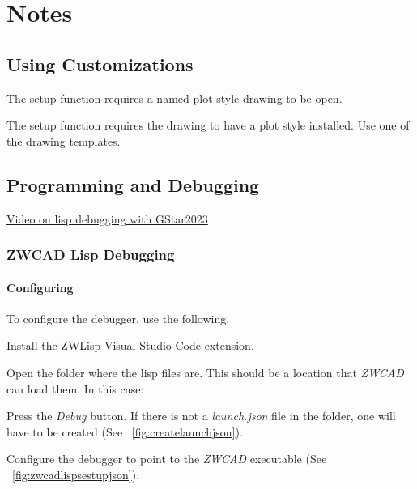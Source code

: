 
\chapter{Notes}
\section{Using Customizations}
\begin{bulletedlist}
	\item The setup function requires a named plot style drawing to be open.
	\item The setup function requires the drawing to have a plot style installed.  Use one of the drawing templates.
\end{bulletedlist}

\section{Programming and Debugging}
\begin{bulletedlist}
	\item \href{https://www.youtube.com/watch?v=Rrgx3TcXNzM}{Video on lisp debugging with GStar2023}
\end{bulletedlist}

\subsection{ZWCAD Lisp Debugging}
\subsubsection{Configuring}
To configure the debugger, use the following.
\begin{numberedlist}
	\item Install the ZWLisp Visual Studio Code extension.
	\item Open the folder where the lisp files are.  This should be a location that \emph{ZWCAD} can load them.  In this case:
	\begin{plainlist}
		\item {}
	\end{plainlist}
	\item Press the \emph{Debug} button.  If there is not a \emph{launch.json} file in the folder, one will have to be created (See \figurename~\ref{fig:createlaunchjson}).
	\item Configure the debugger to point to the \emph{ZWCAD} executable (See \figurename~\ref{fig:zwcadlispsestupjson}).
\end{numberedlist}

